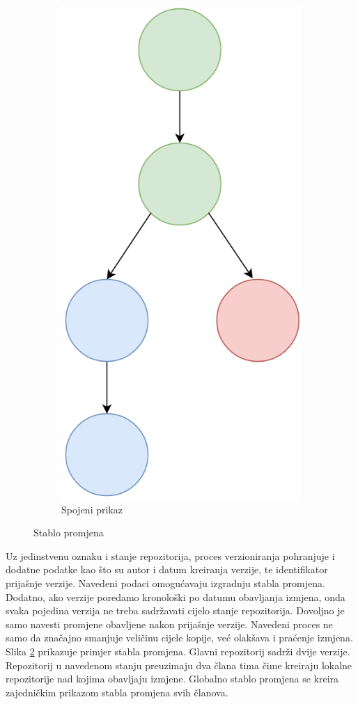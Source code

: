 \documentclass[times, utf8, diplomski, numeric]{fer}
\begin{document}
\begin{figure}[b!]
\begin{subfigure}{.24\textwidth}
\includegraphics[scale=0.4]{VersioningTree}
\caption{Spojeni prikaz}
\label{fig:VersioningTreeD}
\end{subfigure}
\caption{Stablo promjena}
\label{fig:VersioningTree}
\end{figure}

Uz jedinstvenu oznaku i stanje repozitorija, proces verzioniranja pohranjuje i dodatne podatke kao što su autor i datum kreiranja verzije, te identifikator prijašnje verzije. Navedeni podaci omogućavaju izgradnju stabla promjena. Dodatno, ako verzije poredamo kronološki po datumu obavljanja izmjena, onda svaka pojedina verzija ne treba sadržavati cijelo stanje repozitorija. Dovoljno je samo navesti promjene obavljene nakon prijašnje verzije. Navedeni proces ne samo da značajno smanjuje veličinu cijele kopije, već olakšava i praćenje izmjena. Slika \ref{fig:VersioningTree} prikazuje primjer stabla promjena. Glavni repozitorij sadrži dvije verzije. Repozitorij u navedenom stanju preuzimaju dva člana tima čime kreiraju lokalne repozitorije nad kojima obavljaju izmjene. Globalno stablo promjena se kreira zajedničkim prikazom stabla promjena svih članova.
\end{document}
